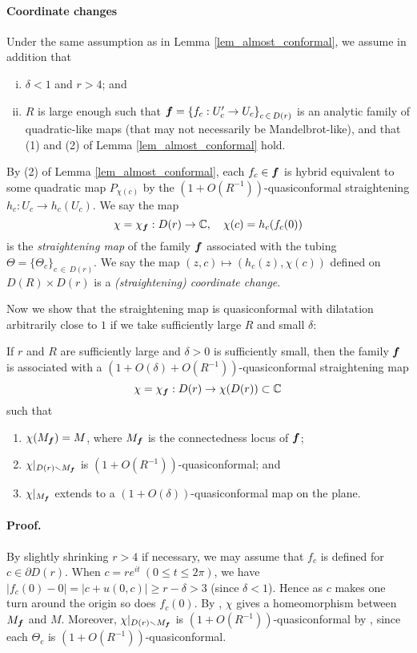 \paragraph{\bf Coordinate changes}
Under the same assumption as in Lemma \ref{lem_almost_conformal},
we assume in addition that  
\begin{enumerate}[(i)]
\item
$\delta<1$ and  $r >4$; and 
\item
$R$ is large enough such that 
${\boldsymbol{f}}={\left\{ f_c:U_c' \to U_c \right\}}_{c\,\in \,D(r)}$
is an analytic family of quadratic-like maps 
(that may not necessarily be Mandelbrot-like),
 and that (1) and (2) of Lemma \ref{lem_almost_conformal} hold.
\end{enumerate}
By (2) of Lemma \ref{lem_almost_conformal}, 
each $f_c \in \boldsymbol{f}$ is hybrid equivalent to 
some quadratic map $P_{\chi(c)}$
by the $(1 + O(R^{-1}))$-quasiconformal straightening $h_c:U_c \to h_c(U_c)$.
We say the map
$$
\chi = \chi_{\boldsymbol{f}}:D(r) \to \mathbb C,\quad \chi(c)=h_c(f_c(0))
$$
is the {\it straightening map} of the family ${\boldsymbol{f}}$
associated with the tubing $\Theta=\{\Theta_c\}_{c \,\in\, D(r)}$.
We say the map $(z,c) \mapsto (h_c(z), \chi(c))$
defined on $D(R)\times D(r)$ 
is a {\it (straightening) coordinate change}.

Now we show that the straightening map is quasiconformal with
dilatation arbitrarily close to $1$ if we take sufficiently large $R$
and small $\delta$:

\begin{lem}
\label{lem_almost_conformal_M}
If $r$ and $R$ are sufficiently large
and $\delta>0$ is sufficiently small,
then the family ${\boldsymbol{f}}$ is associated with 
a $(1+O(\delta)+O(R^{-1}))$-quasiconformal straightening map
$$
\chi=\chi_{\boldsymbol{f}}:D(r) \to \chi(D(r)) \subset \mathbb C
$$
such that
\begin{enumerate}[\rm (1)]
\item $\chi(M_{\boldsymbol{f}})=M$, where $M_{\boldsymbol{f}}$ 
is the connectedness locus of ${\boldsymbol{f}}$;
\item $\chi|_{D(r) \smallsetminus M_{\boldsymbol{f}}}$ is $(1+O(R^{-1}))$-quasiconformal; and
\item $\chi|_{M_{\boldsymbol{f}}}$ extends to a $(1+O(\delta))$-quasiconformal map on the plane.
\end{enumerate}
\end{lem}

\paragraph{\bf Proof.}
By slightly shrinking $r>4$ if necessary, we may assume that 
$f_c$ is defined for  $c \in \partial D(r)$. 
When $c=re^{it}~(0 \le t \le 2 \pi)$, 
we have $|f_c(0)-0|=|c+u(0,c)| \ge r-\delta > 3$ (since $\delta<1$).
Hence as $c$ makes one turn around the origin 
so does $f_c(0)$.
By \cite[p.328]{Douady-Hubbard 1985}, 
$\chi$ gives a homeomorphism between $M_{\boldsymbol{f}}$ and $M$.
Moreover,  
$\chi|_{D(r) \smallsetminus M_{\boldsymbol{f}}}$ is $(1+O(R^{-1}))$-quasiconformal
by \cite[Proposition 20, Lemma in p.327]{Douady-Hubbard 1985},
since each $\Theta_c$ is $(1+O(R^{-1}))$-quasiconformal.

